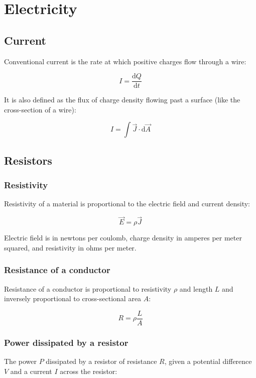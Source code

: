 \documentclass[12pt]{article}
\begin{document}
\section{Electricity}

\subsection{Current}

Conventional current is the rate at which positive charges flow through a wire:

\[
\boxed{
I = \frac{\mathrm{d}Q}{\mathrm{d}t}
}
\]

It is also defined as the flux of charge density flowing past a surface (like the cross-section of a wire):

\[
\boxed{
I = \int \vec{J} \cdot \mathrm{d}\vec{A}
}
\]

\subsection{Resistors}

\subsubsection{Resistivity}

Resistivity of a material is proportional to the electric field and current density:

\[
\boxed{
\vec{E} = \rho \vec{J}
}
\]

Electric field is in newtons per coulomb, charge density in amperes per meter squared, and resistivity in ohms per meter.

\subsubsection{Resistance of a conductor}

Resistance of a conductor is proportional to resistivity $\rho$ and length $L$ and inversely proportional to cross-sectional area $A$:

\[
\boxed{
R = \rho \frac{L}{A}
}
\]

\subsubsection{Power dissipated by a resistor}

The power $P$ dissipated by a resistor of resistance $R$, given a potential difference $V$ and a current $I$ across the resistor:
\end{document}
